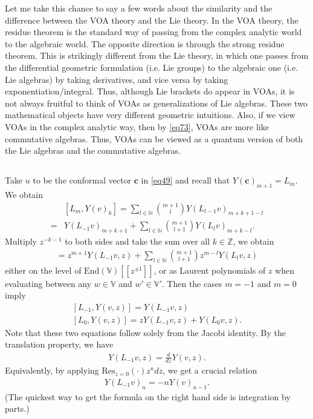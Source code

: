\documentclass[12pt,a4paper,notitlepage]{article}
\theoremstyle{definition}
\theoremstyle{plain}
\newcommand{\End}{\mathrm{End}} %
\newcommand{\Res}{\mathrm{Res}}
\newcommand{\Vbb}{\mathbb V}
\newcommand{\Nbb}{\mathbb N}
\newcommand{\Zbb}{\mathbb Z}
\newcommand{\cbf}{\mathbf c}
\numberwithin{equation}{section}
\begin{document}
Let me take this chance to say a few words about the similarity and the difference between the VOA theory and the Lie theory. In the VOA theory, the residue theorem is the standard way of passing from the complex analytic world to the algebraic world. The opposite direction is through the strong residue theorem. This is strikingly different from the Lie theory, in which one passes from the differential geometric formulation (i.e. Lie groups) to the algebraic one (i.e. Lie algebras) by taking derivatives, and vice versa by taking exponentiation/integral. Thus, although Lie brackets do appear in VOAs, it is not always fruitful to think of VOAs as generalizations of Lie algebras. These two mathematical objects have very different geometric intuitions. Also, if we view VOAs in the complex analytic way, then by \eqref{eq73}, VOAs are more like commutative algebras. Thus, VOAs can be viewed as a quantum version of both the Lie algebras and the commutative algebras.


\subsection{}

Take $u$ to be the conformal vector $\cbf$ in \eqref{eq49} and recall that $Y(\cbf)_{m+1}=L_m$. We obtain
\begin{align}
&[L_m,Y(v)_k]=\sum_{l\in\Nbb}{m+1\choose l}Y(L_{l-1}v)_{m+k+1-l}\nonumber\\	=&Y(L_{-1}v)_{m+k+1}+\sum_{l\in\Nbb}{m+1\choose l+1}Y(L_l v)_{m+k-l}.\label{eq54}
\end{align}
Multiply $z^{-k-1}$ to both sides and take the sum over all $k\in\Zbb$, we obtain
\begin{align}
[L_m,Y(v,z)]=z^{m+1}Y(L_{-1}v,z)+\sum_{l\in\Nbb}{m+1\choose l+1}z^{m-l}Y(L_l v,z)\label{eq68}
\end{align}
either on the level of $\End(\Vbb)[[z^{\pm1}]]$, or as Laurent polynomials of $z$ when evaluating between any $w\in\Vbb$ and $w'\in\Vbb'$. Then the cases $m=-1$ and $m=0$ imply
\begin{subequations}\label{eq50}
\begin{gather}
[L_{-1},Y(v,z)]=Y(L_{-1}v,z)\\
[L_0,Y(v,z)]=zY(L_{-1}v,z)+Y(L_0v,z).		
\end{gather}
\end{subequations}
Note that these two equations follow solely from the Jacobi identity. By the translation property, we have
\begin{align}
Y(L_{-1}v,z)=\frac d{dz}Y(v,z).	\label{eq51}
\end{align}
Equivalently, by applying $\Res_{z=0}(\cdot)z^ndz$, we get a crucial relation
\begin{align}
Y(L_{-1}v)_n=-nY(v)_{n-1}.\label{eq53}	
\end{align}
(The quickest way to get the formula on the right hand side is integration by parts.)
\end{document}
